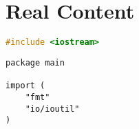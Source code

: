 \documentclass{book}
\begin{document}


\chapter{Real Content}






\begin{lstlisting}[language=C++, caption={Cpp Testing}]
#include <iostream>
\end{lstlisting}




\begin{lstlisting}[caption={Golang Program}]
package main

import (
	"fmt"
	"io/ioutil"
)
\end{lstlisting}


\end{document}
